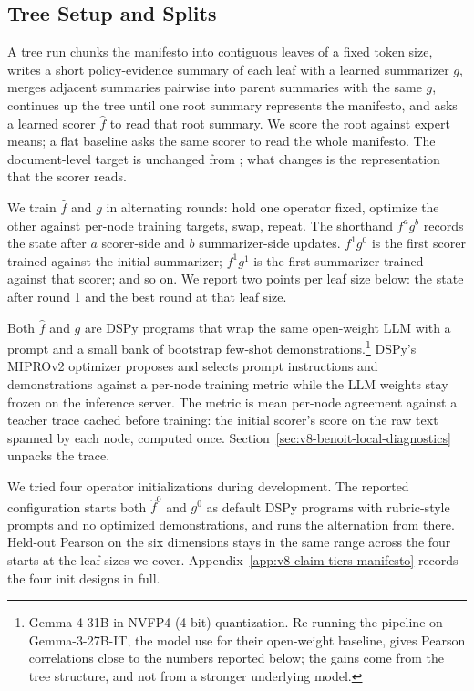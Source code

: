 \subsection{Tree Setup and Splits}\label{sec:v8-benoit-tree-setup}

A tree run chunks the manifesto into contiguous leaves of a fixed
token size, writes a short policy-evidence summary of each leaf with
a learned summarizer \(g\), merges adjacent summaries pairwise into
parent summaries with the same \(g\), continues up the tree until
one root summary represents the manifesto, and asks a learned scorer
\(\widehat f\) to read that root summary. We score the root against
expert means; a flat baseline asks the same scorer to read the whole
manifesto. The document-level target is unchanged from
\citet{BenoitEtAl2025}; what changes is the representation that the
scorer reads.

We train \(\widehat f\) and \(g\) in alternating rounds: hold one
operator fixed, optimize the other against per-node training
targets, swap, repeat. The shorthand \(f^a g^b\) records the state
after \(a\) scorer-side and \(b\) summarizer-side updates. \(f^1
g^0\) is the first scorer trained against the initial summarizer;
\(f^1 g^1\) is the first summarizer trained against that scorer;
and so on. We report two points per leaf size below: the state after
round 1 and the best round at that leaf size.

Both \(\widehat f\) and \(g\) are DSPy programs that wrap the same
open-weight LLM with a prompt and a small bank of bootstrap few-shot
demonstrations.\footnote{Gemma-4-31B in NVFP4 (4-bit) quantization.
Re-running the pipeline on Gemma-3-27B-IT, the model
\citet{BenoitEtAl2025} use for their open-weight baseline, gives
Pearson correlations close to the numbers reported below; the gains
come from the tree structure, and not from a stronger underlying
model.} DSPy's MIPROv2 optimizer proposes and selects prompt
instructions and demonstrations against a per-node training metric
while the LLM weights stay frozen on the inference server. The
metric is mean per-node agreement against a teacher trace cached
before training: the initial scorer's score on the raw text spanned
by each node, computed once. Section~\ref{sec:v8-benoit-local-diagnostics}
unpacks the trace.

We tried four operator initializations during development. The
reported configuration starts both \(\widehat f^0\) and \(g^0\) as
default DSPy programs with rubric-style prompts and no optimized
demonstrations, and runs the alternation from there. Held-out
Pearson on the six dimensions stays in the same range across the
four starts at the leaf sizes we cover.
Appendix~\ref{app:v8-claim-tiers-manifesto} records the four init
designs in full.

